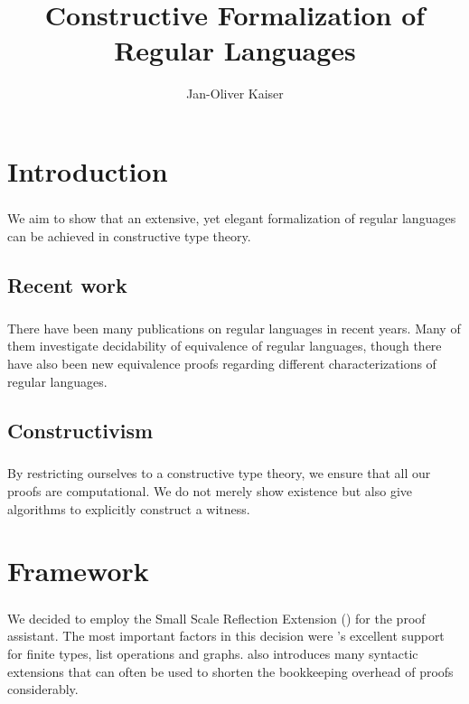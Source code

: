 \documentclass[11pt,a4paper,oneside]{book}
\title{Constructive Formalization of Regular Languages}
\author{Jan-Oliver Kaiser}
\begin{document}
    \maketitle
    \tableofcontents
    
    \chapter{Introduction}

        \paragraph{} We aim to show that an extensive, yet elegant formalization of regular languages can be achieved in constructive type theory.

        \section{Recent work}
        
            \paragraph{} There have been many publications on regular languages in recent years. Many of them investigate decidability of equivalence of regular languages, though there have also been new equivalence proofs regarding different characterizations of regular languages.

        \section{Constructivism }

            \paragraph{} By restricting ourselves to a constructive type theory, we ensure that all our proofs are computational. We do not merely show existence but also give algorithms to explicitly construct a witness. 

    \chapter{Framework}

        \paragraph{}
        We decided to employ the Small Scale Reflection Extension (\textbf{\ssreflect}) for the \textbf{\coq} proof assistant. The most important factors in this decision were \ssreflect's excellent support for finite types, list operations and graphs. \ssreflect{} also introduces many syntactic extensions that can often be used to shorten the bookkeeping overhead of proofs considerably.
\end{document}

